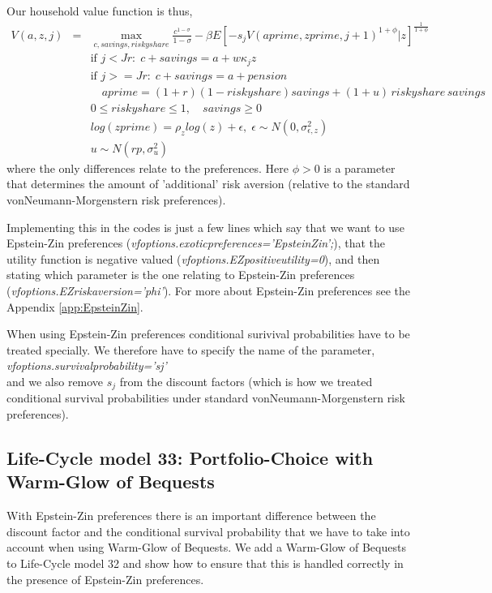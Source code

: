 Our household value function is thus,
\begin{eqnarray*}
 V(a,z,j)&=& \max_{c,savings,riskyshare} \frac{c^{1-\sigma}}{1-\sigma} - \beta  E[- s_j V(aprime,zprime,j+1)^{1+\phi}|z]^\frac{1}{1+\phi} \\
&& \text{if }j<Jr: \; c+savings=a+w \kappa_j z\\
&& \text{if }j>=Jr: \; c+savings=a +pension\\
&& \quad aprime=(1+r) (1-riskyshare) savings + (1+u) \, riskyshare \, savings \\
&& 0\leq riskyshare \leq 1, \quad savings\geq 0 \\
&& log(zprime)=\rho_z log(z) + \epsilon, \; \epsilon \sim N(0,\sigma_{\epsilon,z}^2) \\
&& u \sim N(rp,\sigma_u^2)
\end{eqnarray*}
where the only differences relate to the preferences. Here $\phi>0$ is a parameter that determines the amount of 'additional' risk aversion (relative to the standard vonNeumann-Morgenstern risk preferences).

Implementing this in the codes is just a few lines which say that we want to use Epstein-Zin preferences (\textit{vfoptions.exoticpreferences='EpsteinZin';}), that the utility function is negative valued (\textit{vfoptions.EZpositiveutility=0}), and then stating which parameter is the one relating to Epstein-Zin preferences (\textit{vfoptions.EZriskaversion='phi'}). For more about Epstein-Zin preferences see the Appendix \ref{app:EpsteinZin}.

When using Epstein-Zin preferences conditional surivival probabilities have to be treated specially. We therefore have to specify the name of the parameter,
\\ \textit{vfoptions.survivalprobability='sj'}
\\ \noindent and we also remove $s_j$ from the discount factors (which is how we treated conditional survival probabilities under standard vonNeumann-Morgenstern risk preferences).

\subsection{Life-Cycle model 33: Portfolio-Choice with Warm-Glow of Bequests}
With Epstein-Zin preferences there is an important difference between the discount factor and the conditional survival probability that we have to take into account when using Warm-Glow of Bequests. We add a Warm-Glow of Bequests to Life-Cycle model 32 and show how to ensure that this is handled correctly in the presence of Epstein-Zin preferences.

